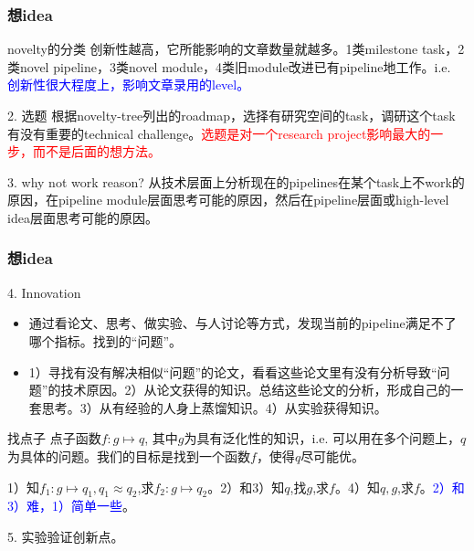 \documentclass{beamer}
\begin{document}
\begin{frame}
    \frametitle{想idea}
    \begin{exampleblock}{novelty的分类}
        创新性越高，它所能影响的文章数量就越多。1类milestone task，2类novel pipeline，3类novel module，4类旧module改进已有pipeline地工作。i.e. \textcolor{blue}{创新性很大程度上，影响文章录用的level。}
    \end{exampleblock}
    \begin{block}{2. 选题}
        根据novelty-tree列出的roadmap，选择有研究空间的task，调研这个task有没有重要的technical challenge。\textcolor{red}{选题是对一个research project影响最大的一步，而不是后面的想方法。}
    \end{block}
    \begin{block}{3. why not work reason?}
        从技术层面上分析现在的pipelines在某个task上不work的原因，在pipeline module层面思考可能的原因，然后在pipeline层面或high-level idea层面思考可能的原因。
    \end{block}

\end{frame}

\begin{frame}
    \frametitle{想idea}
    \begin{block}{4. Innovation}
        \begin{itemize}
            \item 通过看论文、思考、做实验、与人讨论等方式，发现当前的pipeline满足不了哪个指标。找到的“问题”。
            \item 1）寻找有没有解决相似“问题”的论文，看看这些论文里有没有分析导致“问题”的技术原因。2）从论文获得的知识。总结这些论文的分析，形成自己的一套思考。3）从有经验的人身上蒸馏知识。4）从实验获得知识。
        \end{itemize}
    \end{block}
    \begin{exampleblock}{找点子}
        点子函数$f:g\mapsto q$, 其中$g$为具有泛化性的知识，i.e. 可以用在多个问题上，$q$为具体的问题。我们的目标是找到一个函数$f$，使得$q$尽可能优。

        1）知$f_1:g\mapsto q_1,q_1\approx q_2$,求$f_2:g\mapsto q_2$。2）和3）知$q$,找$g$,求$f$。4）知$q,g$,求$f$。\textcolor{blue}{2）和3）难，1）简单一些}。
    \end{exampleblock}
    5. 实验验证创新点。
\end{frame}
\end{document}
